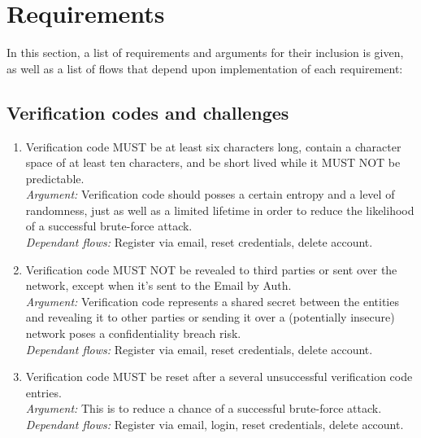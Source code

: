 \section{Requirements}
In this section, a list of requirements and arguments for their inclusion is given, as well as a list of flows 
that depend upon implementation of each requirement:

    \subsection{Verification codes and challenges}
        \begin{enumerate}
                \item Verification code MUST be at least six characters long, contain a character space of at least ten 
                    characters, and be short lived while it MUST NOT be predictable.\\     
                \textit{Argument:} Verification code should posses a certain entropy and a level of randomness, 
                                just as well as a limited lifetime in order to reduce the likelihood of a 
                                successful brute-force attack.\\
                \textit{Dependant flows:} Register via email, reset credentials, delete account.

                \item Verification code MUST NOT be revealed to third parties or sent over the network, except when
                    it's sent to the Email by Auth.\\        
                \textit{Argument:} Verification code represents a shared secret between the entities and revealing 
                                it to other parties or sending it over a (potentially insecure) network poses 
                                a confidentiality breach risk.\\
                \textit{Dependant flows:} Register via email, reset credentials, delete account.

                \item Verification code MUST be reset after a several unsuccessful verification code entries.\\        
                \textit{Argument:} This is to reduce a chance of a successful brute-force attack.\\
                \textit{Dependant flows:} Register via email, login, reset credentials, delete account.


\end{enumerate}
